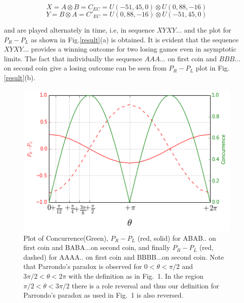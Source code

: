 \documentclass[english,aps,pra,amsmath,amssymb,showpacs,notitlepage,onecolumn]{revtex4-1}
\begin{document}
\begin{equation*}
X=A \otimes B =C_{EC}=U(-51,45,0) \otimes U(0,88,-16)
\end{equation*}
\begin{equation*}
Y=B \otimes A =C'_{EC}=U(0,88,-16) \otimes U(-51,45,0)
\end{equation*}

and are played alternately in time, i.e, in sequence $XYXY\ldots$ and the plot for $P_R -P_L$ as shown in Fig.\ref{result}(a) is obtained. It is evident that the sequence $XYXY\ldots$ provides a winning outcome for two losing games even in asymptotic limits. The fact that individually the sequence $AAA\ldots$ on first coin and $BBB\ldots$ on second coin give a losing outcome can be seen from $P_R-P_L$ plot in Fig.\ref{result}(b).

\begin{figure}[t]
\centering 
\includegraphics[width=.63\textwidth]{gamma.png}
\caption{Plot of Concurrence(Green), $P_{R}-P_{L}$ (red, solid) for ABAB.. on first coin and BABA...on second coin, and finally $P_{R}-P_{L}$ (red, dashed) for AAAA.. on first coin and BBBB...on second coin. Note that Parrondo's paradox is observed for $0<\theta<\pi/2$ and $3\pi/2<\theta<2\pi$ with the definition as in Fig.~1. In the region $\pi/2 <\theta < 3\pi/2$ there is a role reversal and thus our definition for Parrondo's paradox as used in Fig.~1 is also reversed. }
\label{concur}
\end{figure}
\end{document}
